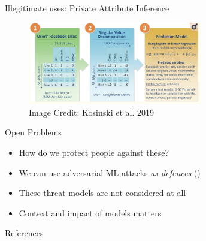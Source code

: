 \documentclass[10pt]{beamer}
\begin{document}
\begin{frame}{Illegitimate uses: Private Attribute Inference}
  \begin{figure}
    \centering
    \includegraphics[width=3in]{likes.png} \\
    Image Credit: Kosinski et al. 2019
  \end{figure}
\end{frame}

\begin{frame}{Open Problems}
  \begin{itemize}[<+-| alert@+>]
    \item How do we protect people against these?
    \item We can use adversarial ML attacks \emph{as defences} (\cite{OverdorfKBTG18})
    \item These threat models are not considered at all
    \item Context and impact of models matters
  \end{itemize}
\end{frame}



\begin{frame}[allowframebreaks]{References}

  
  

\end{frame}
\end{document}
